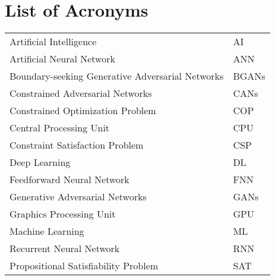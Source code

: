 \chapter*{List of Acronyms}

\begin{minipage}{\linewidth}
\bgroup
\def\arraystretch{1.5}
\begin{tabularx}{\textwidth}{Xl}
Artificial Intelligence \dotfill & AI\\
Artificial Neural Network \dotfill & ANN\\
Boundary-seeking Generative Adversarial Networks \dotfill & BGANs\\
Constrained Adversarial Networks \dotfill & CANs\\
Constrained Optimization Problem \dotfill & COP\\ 
Central Processing Unit \dotfill & CPU\\
Constraint Satisfaction Problem \dotfill & CSP\\
Deep Learning \dotfill & DL\\
Feedforward Neural Network \dotfill & FNN\\
Generative Adversarial Networks \dotfill & GANs\\
Graphics Processing Unit \dotfill & GPU\\
Machine Learning \dotfill & ML\\
Recurrent Neural Network \dotfill & RNN\\
Propositional Satisfiability Problem \dotfill & SAT
\end{tabularx}
\egroup
\end{minipage}
